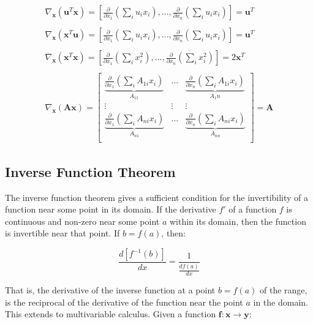 \begin{equation}
\begin{array}{l}
\nabla_\mathbf{x} \left(\mathbf{u}^T\mathbf{x}\right) = \left[\frac{\partial }{\partial x_1}\left(\sum_i u_i x_i\right),...,\frac{\partial }{\partial x_n}\left(\sum_i u_i x_i\right)\right] = \mathbf{u}^T\\
\\
\nabla_\mathbf{x} \left(\mathbf{x}^T\mathbf{u}\right) = \left[\frac{\partial }{\partial x_1}\left(\sum_i u_i x_i\right),...,\frac{\partial }{\partial x_n}\left(\sum_i u_i x_i\right)\right] = \mathbf{u}^T\\
\\
\nabla_\mathbf{x} \left(\mathbf{x}^T\mathbf{x}\right) = \left[\frac{\partial }{\partial x_1}\left(\sum_i x_i^2\right),...,\frac{\partial }{\partial x_n}\left(\sum_i x_i^2\right)\right] = 2\mathbf{x}^T\\
\\
\nabla_\mathbf{x} \left(\mathbf{Ax}\right) = \left[
\begin{array}{ccc} 
\underbrace{\frac{\partial }{\partial x_1}\left(\sum_i A_{1i} x_i\right)}_{A_{11}} &...& \underbrace{\frac{\partial }{\partial x_n}\left(\sum_i A_{1i} x_i\right)}_{A_1n}\\
\vdots&\vdots&\vdots\\
\underbrace{\frac{\partial }{\partial x_1}\left(\sum_i A_{ni} x_i\right)}_{A_{n1}} &...& \underbrace{\frac{\partial }{\partial x_n}\left(\sum_i A_{ni} x_i\right)}_{A_{nn}}\\
\end{array}\right] = \mathbf{A}
\end{array}
\end{equation}


\subsection{Inverse Function Theorem}
The inverse function theorem gives a sufficient condition for the invertibility of a function near some point in its domain. If the derivative $f'$ of a function $f$ is continuous and non-zero near some point $a$ within its domain, then the function is invertible near that point. If $b = f(a)$, then:

\begin{equation}
\frac{d\left[f^{-1}(b)\right]}{dx} = \frac{1}{\frac{df(a)}{dx}}
\end{equation}

That is, the derivative of the inverse function at a point $b=f(a)$ of the range, is the reciprocal of the derivative of the function near the point $a$ in the domain. This extends to multivariable calculus. Given a function $\mathbf{f}: \mathbf{x} \rightarrow \mathbf{y}$:


